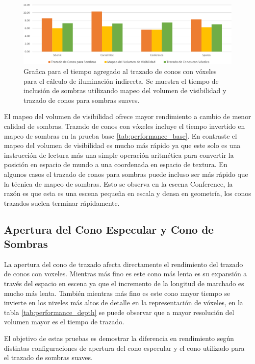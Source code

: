 \begin{figure}[H]
	\centering
	\includegraphics[width=0.95\linewidth]{media/shadowtrace_time_cropped.pdf}
	\caption{Grafica para el tiempo agregado al trazado de conos con vóxeles para el cálculo de iluminación indirecta. Se muestra el tiempo de inclusión de sombras utilizando mapeo del volumen de visibilidad y trazado de conos para sombras suaves.}
	\label{fig:voxeltrace_shadowing}
\end{figure}

El mapeo del volumen de visibilidad ofrece mayor rendimiento a cambio de menor calidad de sombras. Trazado de conos con vóxeles incluye el tiempo invertido en mapeo de sombras en la prueba base \ref{tab:performance_base}. En contraste el mapeo del volumen de visibilidad es mucho más rápido ya que este solo es una instrucción de lectura más una simple operación aritmética para convertir la posición en espacio de mundo a una coordenada en espacio de textura. En algunos casos el trazado de conos para sombras puede incluso ser más rápido que la técnica de mapeo de sombras. Esto se observa en la escena Conference, la razón es que esta es una escena pequeña en escala y densa en geometría, los conos trazados suelen terminar rápidamente.

\subsection{Apertura del Cono Especular y Cono de Sombras}

La apertura del cono de trazado afecta directamente el rendimiento del trazado de conos con voxeles. Mientras más fino es este cono más lenta es su expansión a través del espacio en escena ya que el incremento de la longitud de marchado es mucho más lenta. También mientras más fino es este cono mayor tiempo se invierte en los niveles más altos de detalle en la representación de vóxeles, en la tabla \ref{tab:performance_depth} se puede observar que a mayor resolución del volumen mayor es el tiempo de trazado.

El objetivo de estas pruebas es demostrar la diferencia en rendimiento según distintas configuraciones de apertura del cono especular y el cono utilizado para el trazado de sombras suaves.

